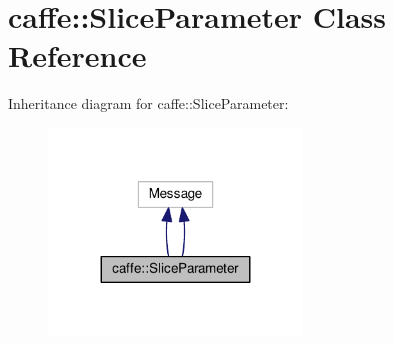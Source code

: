 \hypertarget{classcaffe_1_1_slice_parameter}{}\section{caffe\+:\+:Slice\+Parameter Class Reference}
\label{classcaffe_1_1_slice_parameter}


Inheritance diagram for caffe\+:\+:Slice\+Parameter\+:
\nopagebreak
\begin{figure}[H]
\begin{center}
\leavevmode
\includegraphics[width=191pt]{classcaffe_1_1_slice_parameter__inherit__graph}
\end{center}
\end{figure}
